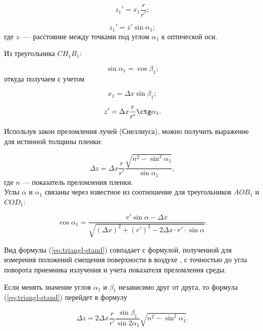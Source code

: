 \begin{equation}
z_1'=x_1\frac{r}{r'};
\end{equation}

\begin{equation}
z_1'=z'\sin \alpha_1;
\end{equation}
где  $z_'$ --- расстояние между точками под углом $\alpha_1$ к оптической оси.

Из треугольника $CH_1B_1$:

\begin{equation}
\sin \alpha_1=\cos \beta_1;
\end{equation}
откуда получаем с учетом

\begin{equation}
x_1 = \Delta x \sin \beta_1;
\end{equation}

\begin{equation}
z'=\Delta x \frac{r}{r'} \ctg \alpha_1.
\end{equation}

Используя закон преломления лучей (Снеллиуса), можно получить выражение для истинной толщины пленки:

\begin{equation}
\Delta z = \Delta x \frac{r}{r'} \frac{\sqrt{n^2-\sin^2\alpha_1}}{\sin \alpha_1},
\label{eq:triangl-stand}
\end{equation}
где $n$ --- показатель преломления пленки.\\


Углы $\alpha$ и $\alpha_1$ связаны через известное из \cite{bronshtein}
соотношение для треугольников $AOB_1$ и $COD_1$:

\begin{equation}
\cos \alpha_1 = \frac{r'\sin \alpha - \Delta x}{\sqrt{(\Delta x)^2
+(r')^2-2\Delta x \cdot r' \cdot \sin \alpha}}.
\label{eq:angl}
\end{equation}

Вид формулы (\ref{eq:triangl-stand}) совпадает с формулой, полученной для
измерения положений смещения поверхности в воздухе \cite{burkov}, с точностью до угла поворота приемника излучения и учета показателя преломления среды.


Если менять значение углов $\alpha_1$ и $\beta_1$ независимо друг от друга, то формула (\ref{eq:triangl-stand}) перейдет в формулу

\begin{equation}
\Delta z = 2 \Delta x \frac{r}{r'} \frac{\sin \beta_1}{\sin 2\alpha_1}\sqrt{n^2-\sin^2\alpha_1}.
\end{equation}

